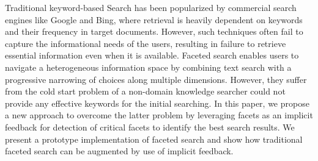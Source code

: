 Traditional keyword-based Search has been popularized by commercial search engines like Google and Bing, where retrieval is heavily dependent on keywords and their frequency in target documents. However, such techniques often fail to capture the informational needs of the users, resulting in failure to retrieve essential information even when it is available. Faceted search enables users to navigate a heterogeneous information space by combining text search with a progressive narrowing of choices along multiple dimensions. However, they suffer from the cold start problem of a non-domain knowledge searcher could not provide any effective keywords for the initial searching. In this paper, we propose a new approach to overcome the latter problem by leveraging facets as an implicit feedback for detection of critical facets to identify the best search results. We present a prototype implementation of faceted search and show how traditional faceted search can be augmented by use of implicit feedback.

